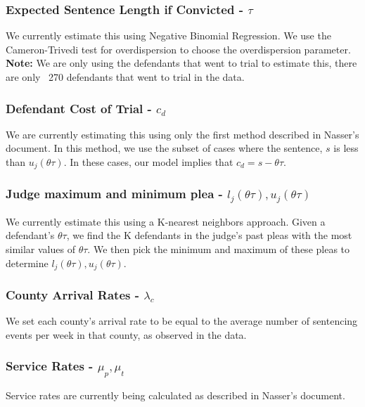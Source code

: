 \documentclass[11pt]{article}
\begin{document}
    \subsubsection{Expected Sentence Length if Convicted - $\tau$}
      We currently estimate this using Negative Binomial Regression. We use the Cameron-Trivedi
      test for overdispersion to choose the overdispersion parameter. \textbf{Note:} We are only using the defendants that went to trial to estimate this, there are only ~270 defendants that went to trial in the data.

    \subsubsection{Defendant Cost of Trial - $c_d$}
      We are currently estimating this using only the first method described in Nasser's document. In this method, we use the subset of cases where the sentence, $s$ is less than $u_j(\theta \tau)$. In these cases,
      our model implies that $c_d = s - \theta \tau$.

    \subsubsection{Judge maximum and minimum plea - $l_j(\theta \tau),u_j(\theta \tau)$}
      We currently estimate this using a K-nearest neighbors approach. Given a defendant's
      $\theta \tau$, we find the K defendants in the judge's past pleas with the
      most similar values of $\theta \tau$. We then pick the minimum and maximum of these pleas
      to determine $l_j(\theta \tau),u_j(\theta \tau)$.

    \subsubsection{County Arrival Rates - $\lambda_c$}
      We set each county's arrival rate to be equal to the average number of sentencing events per week in that county, as observed in the data.

    \subsubsection{Service Rates - $\mu_p, \mu_t$}
      Service rates are currently being calculated as described in Nasser's document.
\end{document}
